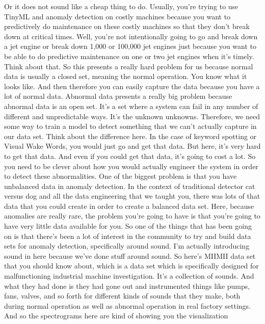   Or it does not sound like a cheap thing to do.
  Usually, you're trying to use TinyML and anomaly detection on costly machines
  because you want to predictively do maintenance on these costly machines
  so that they don't break down at critical times.
  Well, you're not intentionally going to go and break down a jet engine
  or break down 1,000 or 100,000 jet engines just
  because you want to be able to do predictive maintenance on one or two
  jet engines when it's timely.
  Think about that.
  So this presents a really hard problem for us
  because normal data is usually a closed set, meaning the normal operation.
  You know what it looks like.
  And then therefore you can easily capture the data
  because you have a lot of normal data.
  Abnormal data presents a really big problem
  because abnormal data is an open set.
  It's a set where a system can fail in any number
  of different and unpredictable ways.
  It's the unknown unknowns.
  Therefore, we need some way to train a model
  to detect something that we can't actually capture in our data set.
  Think about the difference here.
  In the case of keyword spotting or Visual Wake Words,
  you would just go and get that data.
  But here, it's very hard to get that data.
  And even if you could get that data, it's going to cost a lot.
  So you need to be clever about how you would actually engineer the system
  in order to detect these abnormalities.
  One of the biggest problem is that you have
  unbalanced data in anomaly detection.
  In the context of traditional detector cat versus dog and all the data
  engineering that we taught you, there was lots of that data
  that you could create in order to create a balanced data set.
  Here, because anomalies are really rare, the problem you're going to have
  is that you're going to have very little data available for you.
  So one of the things that has been going on
  is that there's been a lot of interest in the community
  to try and build data sets for anomaly detection, specifically around sound.
  I'm actually introducing sound in here because we've done stuff around sound.
  So here's MIIMII data set that you should know about,
  which is a data set which is specifically
  designed for malfunctioning industrial machine investigation.
  It's a collection of sounds.
  And what they had done is they had gone out
  and instrumented things like pumps, fans, valves,
  and so forth for different kinds of sounds
  that they make, both during normal operation as well as abnormal operation
  in real factory settings.
  And so the spectrograms here are kind of showing you the visualization
